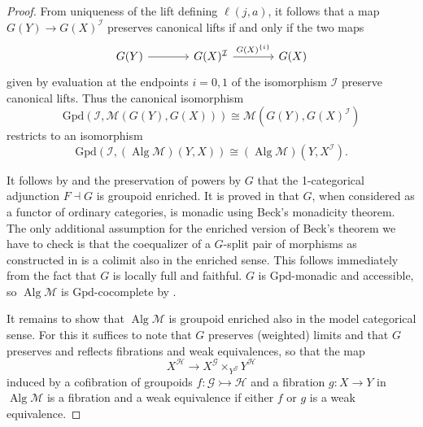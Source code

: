 \documentclass[a4paper]{article}
\theoremstyle{remark}
\theoremstyle{definition}
\begin{document}
\begin{proof}
  From uniqueness of the lift defining $\ell(j, a)$, it follows that a map $G(Y) \rightarrow G(X)^\mathcal{I}$ preserves canonical lifts if and only if the two maps
  \begin{equation}
    \begin{tikzcd}[column sep=large]
      G(Y) \arrow[r] & G(X)^\mathcal{I} \arrow[r, "G(X)^{\{i\}}"] & G(X)
    \end{tikzcd}
  \end{equation}
  given by evaluation at the endpoints $i = 0, 1$ of the isomorphism $\mathcal{I}$ preserve canonical lifts.
  Thus the canonical isomorphism
  \begin{equation}
    \mathrm{Gpd}(\mathcal{I}, \mathcal{M}(G(Y), G(X))) \cong \mathcal{M}(G(Y), G(X)^\mathcal{I})
  \end{equation}
  restricts to an isomorphism
  \begin{equation}
    \mathrm{Gpd}(\mathcal{I}, (\operatorname{Alg} \mathcal{M})(Y, X)) \cong (\operatorname{Alg} \mathcal{M})(Y, X^\mathcal{I}).
  \end{equation}

  It follows by \cite[theorem 4.85]{basic-concepts-of-enriched-category-theory} and the preservation of powers by $G$ that the 1-categorical adjunction $F \dashv G$ is groupoid enriched.
  It is proved in \cite{algebraic-models} that $G$, when considered as a functor of ordinary categories, is monadic using Beck's monadicity theorem.
  The only additional assumption for the enriched version of Beck's theorem \cite[theorem II.2.1]{enriched-kan-extensions} we have to check is that the coequalizer of a $G$-split pair of morphisms as constructed in \cite{algebraic-models} is a colimit also in the enriched sense.
  This follows immediately from the fact that $G$ is locally full and faithful.
  $G$ is $\mathrm{Gpd}$-monadic and accessible, so $\operatorname{Alg} \mathcal{M}$ is $\mathrm{Gpd}$-cocomplete by \cite[theorem 3.8]{two-dimensional-monad-theory}.

  It remains to show that $\operatorname{Alg} \mathcal{M}$ is groupoid enriched also in the model categorical sense.
  For this it suffices to note that $G$ preserves (weighted) limits and that $G$ preserves and reflects fibrations and weak equivalences, so that the map
  \begin{equation}
    X^\mathcal{H} \rightarrow X^\mathcal{G} \times_{Y^\mathcal{G}} Y^\mathcal{H}
  \end{equation}
  induced by a cofibration of groupoids $f : \mathcal{G} \rightarrowtail \mathcal{H}$ and a fibration $g : X \rightarrow Y$ in $\operatorname{Alg} \mathcal{M}$ is a fibration and a weak equivalence if either $f$ or $g$ is a weak equivalence.
\end{proof}
\end{document}
